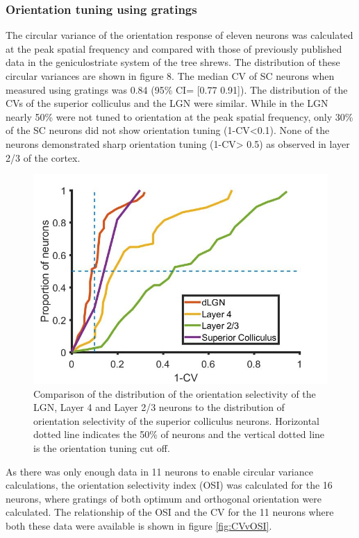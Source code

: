	
	\subsubsection{Orientation tuning using gratings}
	
The circular variance of the orientation response of eleven neurons was
calculated at the peak spatial frequency and compared with those of
previously published data in the geniculostriate system of the tree
shrews. The distribution of these circular variances are shown in figure
8. The median CV of SC neurons when measured using gratings was 0.84
(95\% CI= {[}0.77 0.91{]}). The distribution of the CVs of the superior
colliculus and the LGN were similar. While in the LGN nearly 50\% were
not tuned to orientation at the peak spatial frequency, only 30\% of the
SC neurons did not show orientation tuning (1-CV\textless{}0.1). None of
the neurons demonstrated sharp orientation tuning (1-CV\textgreater{}
0.5) as observed in layer 2/3 of the cortex.
		
	\begin{figure}[]
		\includegraphics[width=\linewidth]{superiorcolliculus/orientation_bias_SG_geniculostriate_2.jpg}
		\caption{ Comparison of the distribution of the orientation
			selectivity of the LGN, Layer 4 and Layer 2/3 neurons to the
			distribution of orientation selectivity of the superior colliculus
			neurons. Horizontal dotted line indicates the 50\% of neurons and the
			vertical dotted line is the orientation tuning cut off.}
		\label{fig:CVvanhooser}			
	\end{figure}
	
As there was only enough data in 11 neurons to enable circular variance
calculations, the orientation selectivity index (OSI) was calculated for
the 16 neurons, where gratings of both optimum and orthogonal
orientation were calculated. The relationship of the OSI and the CV for
the 11 neurons where both these data were available is shown in figure \ref{fig:CVvOSI}. 
	
